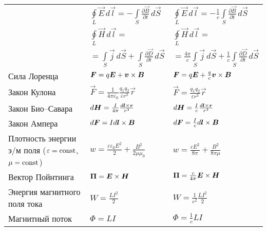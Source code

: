 \begin{labsupplement}
\begin{longtable}{p{40mm}p{30mm}p{30mm}}
    & $\oint\limits_{L}\vec{E}\,d\vec{l}=-\int\limits_{S}\frac{\partial\vec{B}}{\partial t}\,d\vec{S}$
    & $\oint\limits_{L}\vec{E}\,d\vec{l}=-\frac{1}{c}\int\limits_{S}\frac{\partial\vec{B}}{\partial t}\,d\vec{S}$\\
    & $\oint\limits_{L}\vec{H}\,d\vec{l}=$
    & $\oint\limits_{L}\vec{H}\,d\vec{l}=$\\
    & $=\int\limits_{S}\vec{j}\,d\vec{S}+\int\limits_{S}\frac{\partial\vec{D}}{\partial t}\,d\vec{S}$
    & $=\frac{4\pi}{c}\int\limits_{S}\vec{j}\,d\vec{S}+\frac{1}{c}\int\limits_{S}\frac{\partial\vec{D}}{\partial t}\,d\vec{S}$
    \bigstrut[b] \\ \hline
\bigstrut
Сила Лоренца
                & ${\boldsymbol{F}}=q{\boldsymbol{E}}+{\boldsymbol{v}} \times {\boldsymbol{B}}$
                & ${\boldsymbol{F}}=q{\boldsymbol{E}}+\frac{q}{c}{\boldsymbol{v}} \times {\boldsymbol{B}}$ \\ \hline
\bigstrut
Закон Кулона
                & $\vec{F}=\frac{1}{4\pi\varepsilon_0}\frac{q_1q_2}{\varepsilon r^3}\vec{r}$
                & $\vec{F}=\frac{q_1q_2}{\varepsilon r^3}\vec{r}$ \\ \hline
Закон Био--Савара
                & $d{\boldsymbol{H}}=\frac{I}{4\pi}\frac{d{\boldsymbol{l}} \times {\boldsymbol{r}}}{r^3}$
                & $d{\boldsymbol{H}}=\frac{I}{c}\frac{d{\boldsymbol{l}} \times {\boldsymbol{r}}}{r^3}$ \bigstrut \\ \hline
Закон Ампера
                & $d{\boldsymbol{F}}=Id{\boldsymbol{l}} \times {\boldsymbol{B}}$
                & $d{\boldsymbol{F}}=\frac{I}{c}d{\boldsymbol{l}} \times {\boldsymbol{B}}$ \bigstrut\\ \hline
\parbox{40mm}{Плотность энергии э/м\\[-2.5pt] поля
    ($\varepsilon=\mathrm{const}$, $\mu=\mathrm{const}$)}
& $w=\frac{\varepsilon\varepsilon_0E^2}{2}
    +\frac{B^2}{2\mu\mu_0}$
& $w=\frac{\varepsilon E^2}{8\pi} + \frac{B^2}{8\pi \mu}$
                \bigstrut \\ \hline
Вектор Пойнтинга
                & ${\boldsymbol{\Pi}}={\boldsymbol{E}} \times {\boldsymbol{H}}$
                & ${\boldsymbol{\Pi}}=\frac{c}{4\pi}{\boldsymbol{E}} \times {\boldsymbol{H}}$ \bigstrut\\ \hline
\parbox{40mm}{Энергия магнитного\\[-2.5pt] поля тока}
                & $W=\frac{LI^2}{2}$
                & $W=\frac{1}{c^2}\frac{LI^2}{2}$ \bigstrut\\ \hline
Магнитный поток
        & $\Phi=LI$	&    $\Phi=\frac{1}{c}LI$	\bigstrut\\ \hline

\end{longtable}
\end{labsupplement}
